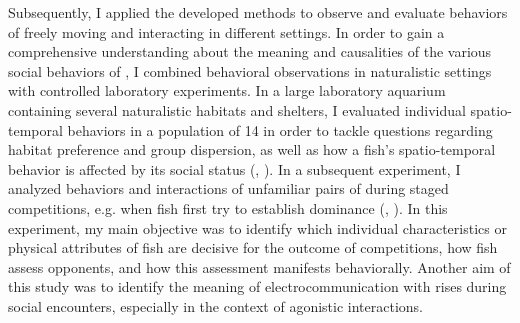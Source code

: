 Subsequently, I applied the developed methods to observe and evaluate behaviors of freely moving and interacting \lepto{} in different settings. In order to gain a comprehensive understanding about the meaning and causalities of the various social behaviors of \lepto{}, I combined behavioral observations in naturalistic settings with controlled laboratory experiments. In a large laboratory aquarium containing several naturalistic habitats and shelters, I evaluated individual spatio-temporal behaviors in a population of 14 \lepto{} in order to tackle questions regarding habitat preference and group dispersion, as well as how a fish's spatio-temporal behavior is affected by its social status (, \citealp{Raab2019}). In a subsequent experiment, I analyzed behaviors and interactions of unfamiliar pairs of \lepto{} during staged competitions, e.g. when fish first try to establish dominance (, \citealp{Raab2021}). In this experiment, my main objective was to identify which individual characteristics or physical attributes of fish are decisive for the outcome of competitions, how fish assess opponents, and how this assessment manifests behaviorally. Another aim of this study was to identify the meaning of electrocommunication with rises during social encounters, especially in the context of agonistic interactions. 


%
%